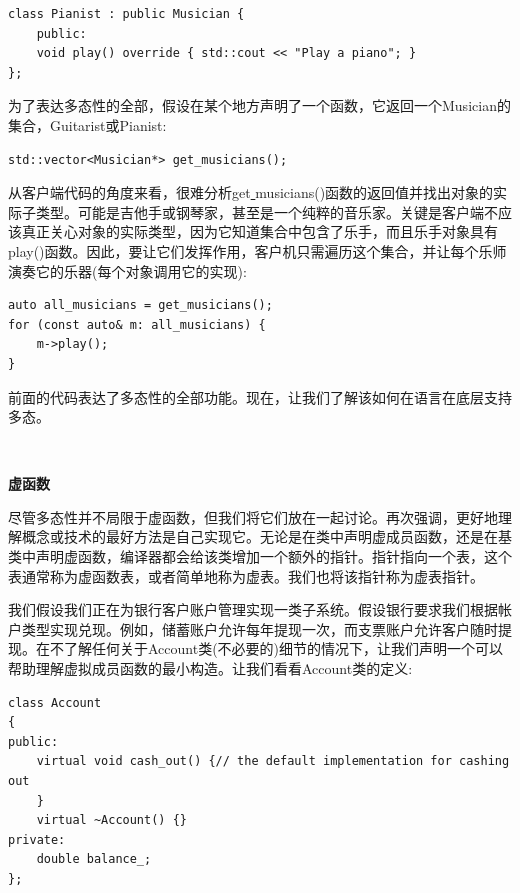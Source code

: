 \begin{lstlisting}[caption={}]
class Pianist : public Musician {
	public:
	void play() override { std::cout << "Play a piano"; }
};
\end{lstlisting}

为了表达多态性的全部，假设在某个地方声明了一个函数，它返回一个Musician的集合，Guitarist或Pianist: \par

\begin{lstlisting}[caption={}]
std::vector<Musician*> get_musicians();
\end{lstlisting}

从客户端代码的角度来看，很难分析get\underline{ }musicians()函数的返回值并找出对象的实际子类型。可能是吉他手或钢琴家，甚至是一个纯粹的音乐家。关键是客户端不应该真正关心对象的实际类型，因为它知道集合中包含了乐手，而且乐手对象具有play()函数。因此，要让它们发挥作用，客户机只需遍历这个集合，并让每个乐师演奏它的乐器(每个对象调用它的实现):\par

\begin{lstlisting}[caption={}]
auto all_musicians = get_musicians();
for (const auto& m: all_musicians) {
	m->play();
}
\end{lstlisting}

前面的代码表达了多态性的全部功能。现在，让我们了解该如何在语言在底层支持多态。 \par

\noindent\textbf{}\ \par
\textbf{虚函数} \ \par
尽管多态性并不局限于虚函数，但我们将它们放在一起讨论。再次强调，更好地理解概念或技术的最好方法是自己实现它。无论是在类中声明虚成员函数，还是在基类中声明虚函数，编译器都会给该类增加一个额外的指针。指针指向一个表，这个表通常称为虚函数表，或者简单地称为虚表。我们也将该指针称为虚表指针。 \par
我们假设我们正在为银行客户账户管理实现一类子系统。假设银行要求我们根据帐户类型实现兑现。例如，储蓄账户允许每年提现一次，而支票账户允许客户随时提现。在不了解任何关于Account类(不必要的)细节的情况下，让我们声明一个可以帮助理解虚拟成员函数的最小构造。让我们看看Account类的定义: \par

\begin{lstlisting}[caption={}]
class Account
{
public:
	virtual void cash_out() {// the default implementation for cashing out
	}
	virtual ~Account() {}
private:
	double balance_;
};
\end{lstlisting}


